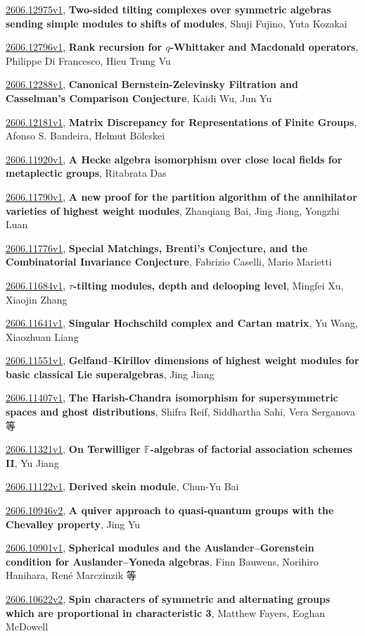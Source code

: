 \documentclass[9pt, a4paper]{article}
\theoremstyle{plain}
\theoremstyle{definition}
\theoremstyle{remark}
\newcommand{\arxiv}[3]{\href{https://arxiv.org/abs/#1}{#1}, \textbf{\textcolor{arxivblue}{#2}}, #3}
\begin{document}
\arxiv{2606.12975v1}{Two-sided tilting complexes over symmetric algebras sending simple modules to shifts of modules}{Shuji Fujino, Yuta Kozakai}

\arxiv{2606.12796v1}{Rank recursion for $q$-Whittaker and Macdonald operators}{Philippe Di Francesco, Hieu Trung Vu}

\arxiv{2606.12288v1}{Canonical Bernstein-Zelevinsky Filtration and Casselman's Comparison Conjecture}{Kaidi Wu, Jun Yu}

\arxiv{2606.12181v1}{Matrix Discrepancy for Representations of Finite Groups}{Afonso S. Bandeira, Helmut Bölcskei}

\arxiv{2606.11920v1}{A Hecke algebra isomorphism over close local fields for metaplectic groups}{Ritabrata Das}

\arxiv{2606.11790v1}{A new proof for the partition algorithm of the annihilator varieties of highest weight modules}{Zhanqiang Bai, Jing Jiang, Yongzhi Luan}

\arxiv{2606.11776v1}{Special Matchings, Brenti's Conjecture, and the Combinatorial Invariance Conjecture}{Fabrizio Caselli, Mario Marietti}

\arxiv{2606.11684v1}{$τ$-tilting modules, depth and delooping level}{Mingfei Xu, Xiaojin Zhang}

\arxiv{2606.11641v1}{Singular Hochschild complex and Cartan matrix}{Yu Wang, Xiaozhuan Liang}

\arxiv{2606.11551v1}{Gelfand--Kirillov dimensions of highest weight modules for basic classical Lie superalgebras}{Jing Jiang}

\arxiv{2606.11407v1}{The Harish-Chandra isomorphism for supersymmetric spaces and ghost distributions}{Shifra Reif, Siddhartha Sahi, Vera Serganova 等}

\arxiv{2606.11321v1}{On Terwilliger $\mathbb{F}$-algebras of factorial association schemes II}{Yu Jiang}

\arxiv{2606.11122v1}{Derived skein module}{Chun-Yu Bai}

\arxiv{2606.10946v2}{A quiver approach to quasi-quantum groups with the Chevalley property}{Jing Yu}

\arxiv{2606.10901v1}{Spherical modules and the Auslander--Gorenstein condition for Auslander--Yoneda algebras}{Finn Bauwens, Norihiro Hanihara, René Marczinzik 等}

\arxiv{2606.10622v2}{Spin characters of symmetric and alternating groups which are proportional in characteristic 3}{Matthew Fayers, Eoghan McDowell}
\end{document}
